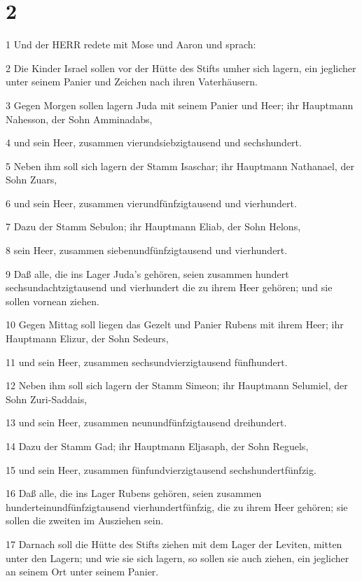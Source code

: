 \chapter{2}

\par 1 Und der HERR redete mit Mose und Aaron und sprach:
\par 2 Die Kinder Israel sollen vor der Hütte des Stifts umher sich lagern, ein jeglicher unter seinem Panier und Zeichen nach ihren Vaterhäusern.
\par 3 Gegen Morgen sollen lagern Juda mit seinem Panier und Heer; ihr Hauptmann Nahesson, der Sohn Amminadabs,
\par 4 und sein Heer, zusammen vierundsiebzigtausend und sechshundert.
\par 5 Neben ihm soll sich lagern der Stamm Isaschar; ihr Hauptmann Nathanael, der Sohn Zuars,
\par 6 und sein Heer, zusammen vierundfünfzigtausend und vierhundert.
\par 7 Dazu der Stamm Sebulon; ihr Hauptmann Eliab, der Sohn Helons,
\par 8 sein Heer, zusammen siebenundfünfzigtausend und vierhundert.
\par 9 Daß alle, die ins Lager Juda's gehören, seien zusammen hundert sechsundachtzigtausend und vierhundert die zu ihrem Heer gehören; und sie sollen vornean ziehen.
\par 10 Gegen Mittag soll liegen das Gezelt und Panier Rubens mit ihrem Heer; ihr Hauptmann Elizur, der Sohn Sedeurs,
\par 11 und sein Heer, zusammen sechsundvierzigtausend fünfhundert.
\par 12 Neben ihm soll sich lagern der Stamm Simeon; ihr Hauptmann Selumiel, der Sohn Zuri-Saddais,
\par 13 und sein Heer, zusammen neunundfünfzigtausend dreihundert.
\par 14 Dazu der Stamm Gad; ihr Hauptmann Eljasaph, der Sohn Reguels,
\par 15 und sein Heer, zusammen fünfundvierzigtausend sechshundertfünfzig.
\par 16 Daß alle, die ins Lager Rubens gehören, seien zusammen hunderteinundfünfzigtausend vierhundertfünfzig, die zu ihrem Heer gehören; sie sollen die zweiten im Ausziehen sein.
\par 17 Darnach soll die Hütte des Stifts ziehen mit dem Lager der Leviten, mitten unter den Lagern; und wie sie sich lagern, so sollen sie auch ziehen, ein jeglicher an seinem Ort unter seinem Panier.

